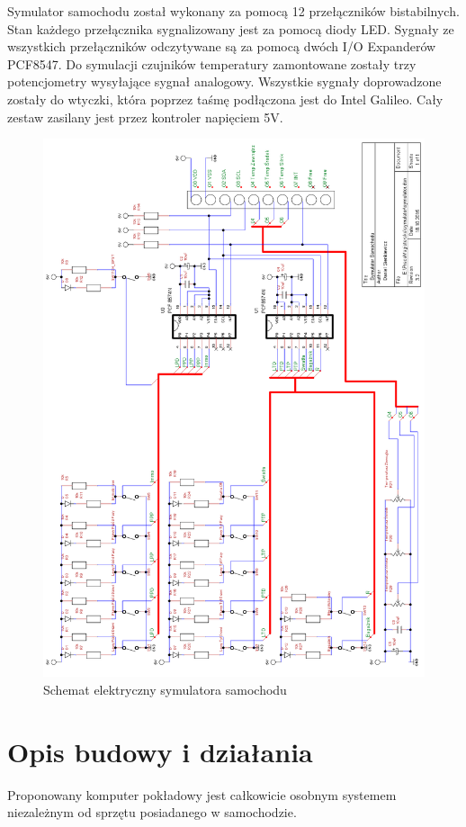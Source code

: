 \documentclass{xmgr}
\begin{document}
Symulator samochodu został wykonany za pomocą 12 przełączników bistabilnych. Stan każdego przełącznika sygnalizowany jest za pomocą diody LED. Sygnały ze wszystkich przełączników odczytywane są za pomocą dwóch I/O Expanderów PCF8547. Do symulacji czujników temperatury zamontowane zostały trzy potencjometry wysyłające sygnał analogowy. Wszystkie sygnały doprowadzone zostały do wtyczki, która poprzez taśmę podłączona jest do Intel Galileo. Cały zestaw zasilany jest przez kontroler napięciem 5V.

\begin{figure}[!h]
    \centering
    	\includegraphics[height=0.64\textheight]{images/symulator.png}
    \caption{Schemat elektryczny symulatora samochodu}
\end{figure}

\section{Opis budowy i działania}
Proponowany komputer pokładowy jest całkowicie osobnym systemem niezależnym od sprzętu posiadanego w samochodzie.
\end{document}
